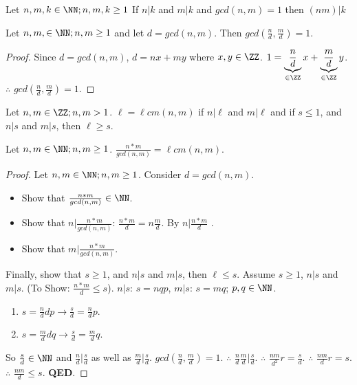 \begin{theorem}\label{lemmox}
Let $n,m,k\in \NN;n,m,k\ge 1$ If $n|k$ and $m|k$ and $gcd(n,m)=1$ then $(nm)|k$
\end{theorem}
\begin{theorem}
Let $n,m,\in\NN;n,m\ge 1$ and let $d=gcd(n,m)$. Then $gcd(\frac{n}{d},\frac{m}{d})=1$.
\end{theorem}
\begin{proof}
Since $d=gcd(n,m)$, $d=nx+my$ where $x,y\in\ZZ$. $1=\underbrace{\frac{n}{d}}_{\in\ZZ}x+\underbrace{\frac{m}{d}}_{\in\ZZ}y$. $\therefore$ $gcd(\frac{n}{d},\frac{m}{d})=1$.
\end{proof}
\begin{definition}
Let $n,m\in\ZZ;n,m > 1$. $\ell=\ell cm(n,m)$ if $n|\ell$ and $m|\ell$ and if $s\le 1$, and $n|s$ and $m|s$, then $\ell \ge s$.
\end{definition}
\begin{theorem}
Let $n,m\in\NN;n,m\ge 1$. $\frac{n*m}{gcd(n,m)} = \ell cm(n,m)$.
\end{theorem}
\begin{proof}
Let $n,m\in\NN;n,m\ge 1$. Consider $d=gcd(n,m)$.
\begin{itemize}
\item Show that $\frac{n*m}{gcd(n,m)}\in\NN$. \checkmark
\item Show that $n|\frac{n*m}{gcd(n,m)}$: $\frac{n*m}{d}=n\frac{m}{d}$. By $n|\frac{n*m}{d}$ \checkmark.
\item Show that $m|\frac{n*m}{gcd(n,m)}$. \checkmark
\end{itemize}
Finally, show that $s\ge 1$, and $n|s$ and $m|s$, then $\ell \le s$. Assume $s\ge 1$, $n|s$ and $m|s$. (To Show: $\frac{n*m}{d}\le s$). $n|s$: $s=nqp$, $m|s$: $s=mq$; $p,q\in\NN$. 
\begin{enumerate}
\item $s=\frac{n}{d}dp \to \frac{s}{d}=\frac{n}{d}p$. 
\item $s=\frac{m}{d}dq \to \frac{s}{d}=\frac{m}{d}q$.
\end{enumerate} 
So $\frac{s}{d}\in\NN$ and $\frac{n}{d}|\frac{s}{d}$ as well as $\frac{m}{d}|\frac{s}{d}$. $gcd(\frac{n}{d},\frac{m}{d})=1$. $\therefore$ $\frac{n}{d}\frac{m}{d}|\frac{s}{d}$. $\therefore$ $\frac{nm}{d^2}r=\frac{s}{d}$. $\therefore$ $\frac{nm}{d}r=s$. $\therefore$ $\frac{nm}{d} \le s$. \textbf{QED}.
\end{proof}


